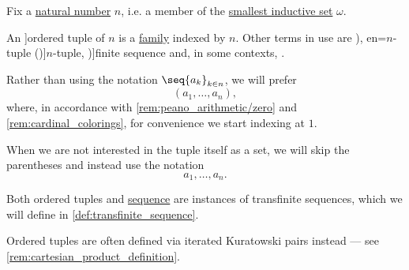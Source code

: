 \begin{definition}\label{def:ordered_tuple}\mimprovised
  Fix a \hyperref[def:natural_numbers]{natural number} \( n \), i.e. a member of the \hyperref[def:smallest_inductive_set]{smallest inductive set} \( \omega \).

  An \term[ru=кортеж (\cite[def. 1.2]{БелоусовТкачёв2004ДискретнаяМатематика}]{ordered tuple} of  \( n \) is a \hyperref[def:indexed_family]{family} indexed by \( n \). Other terms in use are \term[ru=упорядоченная \( n \)-торка (\cite[\S 1.2.3]{КусраевКутателадзе2005БулевозначныйАнализ}), en=\( n \)-tuple (\cite[51]{Enderton1977SetTheory})]{\( n \)-tuple}, \term[en=finite sequence (\cite[9]{Halmos1960NaiveSetTheory})]{finite sequence} and, in some contexts, .

  Rather than using the notation \( \seq{ a_k }_{k \in n} \), we will prefer
  \begin{equation*}
    (a_1, \ldots, a_n),
  \end{equation*}
  where, in accordance with \cref{rem:peano_arithmetic/zero} and \cref{rem:cardinal_colorings}, for convenience we start indexing at \( 1 \).

  When we are not interested in the tuple itself as a set, we will skip the parentheses and instead use the notation
  \begin{equation*}
    a_1, \ldots, a_n.
  \end{equation*}
\end{definition}
\begin{comments}
  \item Both ordered tuples and \hyperref[def:sequence]{sequence} are instances of transfinite sequences, which we will define in \cref{def:transfinite_sequence}.

  \item Ordered tuples are often defined via iterated Kuratowski pairs instead --- see \cref{rem:cartesian_product_definition}.
\end{comments}

